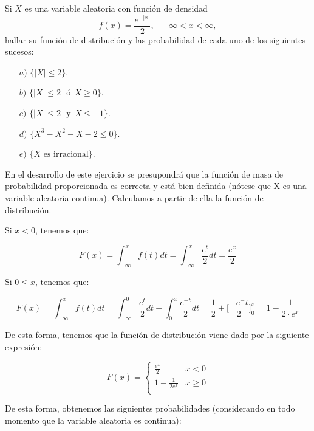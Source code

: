 \problem

Si $X$ es una variable aleatoria con funci{\'o}n de densidad
	$$f(x)=\frac{e^{-|x|}}{2}, \ \ -\infty < x < \infty,$$ hallar su funci{\'o}n de distribuci{\'o}n
	y  las probabilidad de cada uno de los
	siguientes sucesos:
	\begin{enumerate}
		\item [$a)$]$\{|X|\leq 2\}$.
		\item [$b)$]$\{|X|\leq 2\ \ \ \mbox{{\'o}} \ \ X \geq 0\}.$
		\item [$c)$] $\{|X|\leq 2\ \ \ \mbox{y} \ \ X \leq -1\}.$
		\item [$d)$] $\{X^3-X^2-X-2 \leq 0 \}.$
		\item [$e)$] $\{ X \mbox{ es irracional}\}.$
	\end{enumerate}
	
	En el desarrollo de este ejercicio se presupondrá que la función de masa de probabilidad proporcionada es correcta y está bien definida (nótese que X es una variable aleatoria continua). Calculamos a partir de ella la función de distribución. 
	
	Si $ x < 0 $, tenemos que: 
	
	$$F(x) = \int_{-\infty}^x f(t) dt = \int_{-\infty}^x \frac{e^t}{2} dt = \frac{e^x}{2}$$ 
	
	Si $ 0 \leq x$, tenemos que: 
	
	$$F(x) = \int_{-\infty}^x f(t) dt = \int_{-\infty}^0 \frac{e^t}{2} dt + \int_0^x \frac{e^{-t}}{2}dt = \frac{1}{2} + \Big[ \frac{-e^-t}{2} \Big]^x_0 = 1 - \frac{1}{2·e^x}$$ 
	
	De esta forma, tenemos que la función de distribución viene dado por la siguiente expresión: 
	
	\begin{equation*}
	F(x) = \left \{
	\begin{array}{lcc}
	\frac{e^x}{2}        & x < 0 \\
	1 - \frac{1}{2e^x}   & x \geq 0 \\
	\end{array}
	\right.
	\end{equation*}
	
	De esta forma, obtenemos las siguientes probabilidades (considerando en todo momento que la variable aleatoria es continua):
	

